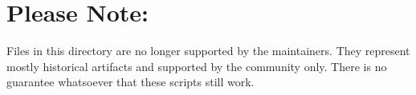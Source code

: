\chapter{Please Note\+:}
\hypertarget{md_build_2__deps_2googletest-src_2googlemock_2scripts_2_r_e_a_d_m_e}{}\label{md_build_2__deps_2googletest-src_2googlemock_2scripts_2_r_e_a_d_m_e}
\label{md_build_2__deps_2googletest-src_2googlemock_2scripts_2_r_e_a_d_m_e_autotoc_md383}%
%
 Files in this directory are no longer supported by the maintainers. They represent mostly historical artifacts and supported by the community only. There is no guarantee whatsoever that these scripts still work. 
